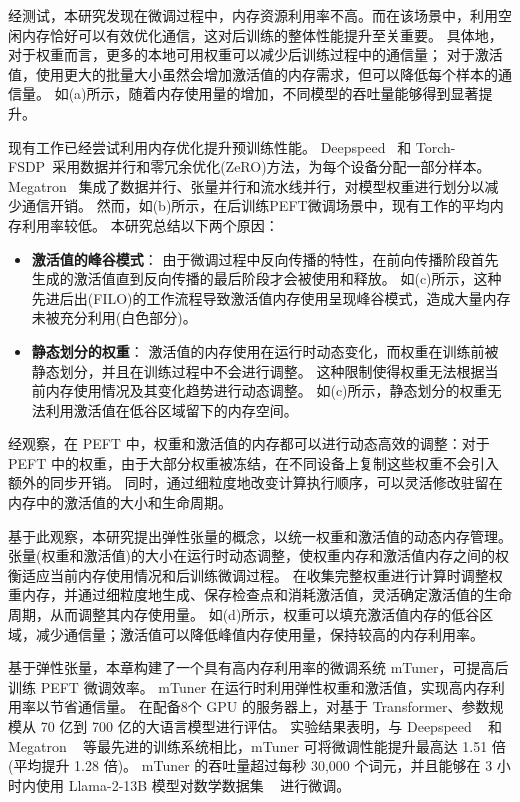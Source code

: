 经测试，本研究发现在微调过程中，内存资源利用率不高。而在该场景中，利用空闲内存恰好可以有效优化通信，这对后训练的整体性能提升至关重要。
具体地，对于权重而言，更多的本地可用权重可以减少后训练过程中的通信量；
对于激活值，使用更大的批量大小虽然会增加激活值的内存需求，但可以降低每个样本的通信量。
如(a)所示，随着内存使用量的增加，不同模型的吞吐量能够得到显著提升。

现有工作已经尝试利用内存优化提升预训练性能。
Deepspeed~\cite{rasley2020DeepSpeed} 和 Torch-FSDP~\cite{TorchFSDP}采用数据并行和零冗余优化(ZeRO)方法，为每个设备分配一部分样本。
Megatron~\cite{krothikanti2022megatronv3}  集成了数据并行、张量并行和流水线并行，对模型权重进行划分以减少通信开销。
然而，如(b)所示，在后训练PEFT微调场景中，现有工作的平均内存利用率较低。
本研究总结以下两个原因：

\begin{itemize}
    \item 
    \textbf{激活值的峰谷模式}：
    由于微调过程中反向传播的特性，在前向传播阶段首先生成的激活值直到反向传播的最后阶段才会被使用和释放。
    如(c)所示，这种先进后出(FILO)的工作流程导致激活值内存使用呈现峰谷模式，造成大量内存未被充分利用(白色部分)。
    \item 
    \textbf{静态划分的权重}：
    激活值的内存使用在运行时动态变化，而权重在训练前被静态划分，并且在训练过程中不会进行调整。
    这种限制使得权重无法根据当前内存使用情况及其变化趋势进行动态调整。
    如(c)所示，静态划分的权重无法利用激活值在低谷区域留下的内存空间。
\end{itemize}

经观察，在 PEFT 中，权重和激活值的内存都可以进行动态高效的调整：对于 PEFT 中的权重，由于大部分权重被冻结，在不同设备上复制这些权重不会引入额外的同步开销。
同时，通过细粒度地改变计算执行顺序，可以灵活修改驻留在内存中的激活值的大小和生命周期。

基于此观察，本研究提出弹性张量的概念，以统一权重和激活值的动态内存管理。
张量(权重和激活值)的大小在运行时动态调整，使权重内存和激活值内存之间的权衡适应当前内存使用情况和后训练微调过程。
在收集完整权重进行计算时调整权重内存，并通过细粒度地生成、保存检查点和消耗激活值，灵活确定激活值的生命周期，从而调整其内存使用量。
如(d)所示，权重可以填充激活值内存的低谷区域，减少通信量；激活值可以降低峰值内存使用量，保持较高的内存利用率。

基于弹性张量，本章构建了一个具有高内存利用率的微调系统 mTuner，可提高后训练 PEFT 微调效率。
mTuner 在运行时利用弹性权重和激活值，实现高内存利用率以节省通信量。
在配备8个 GPU 的服务器上，对基于 Transformer、参数规模从 70 亿到 700 亿的大语言模型进行评估。
实验结果表明，与 Deepspeed ~\cite{rasley2020DeepSpeed} 和 Megatron ~\cite{krothikanti2022megatronv3} 等最先进的训练系统相比，mTuner 可将微调性能提升最高达 1.51 倍(平均提升 1.28 倍)。
mTuner 的吞吐量超过每秒 30,000 个词元，并且能够在 3 小时内使用 Llama-2-13B 模型对数学数据集 ~\cite{math-datatset}  进行微调。

